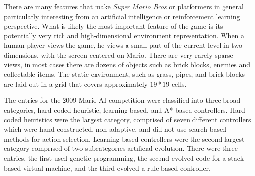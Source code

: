 \documentclass[12pt]{article}
\begin{document}
\begin{multicols*}{2}
There are many features that make \textit {Super Mario Bros} or platformers in general particularly interesting from 
an artificial intelligence or reinforcement learning perspective. What is likely the most important feature of the game 
is its potentially very rich and high-dimensional environment representation. When a human player views the 
game, he views a small part of the current level in two dimensions, with the screen centered on Mario. There are 
very rarely sparse views, in most cases there are dozens of objects such as brick blocks, enemies and collectable 
items. The static environment, such as grass, pipes, and brick blocks are laid out in a grid that covers 
approximately $19 * 19$ cells.

The entries for the 2009 Mario AI competition were classified into three broad categories, hard-coded heuristic, 
learning-based, and A*-based controllers. Hard-coded heuristics were the largest category, comprised of seven 
different controllers which were hand-constructed, non-adaptive, and did not use search-based methods for action selection. Learning based controllers were the second largest category comprised of two subcategories artificial evolution. There were three entries, the first used genetic programming, the second evolved code for a stack-based virtual machine, and the third evolved a rule-based controller. 
\end{multicols*}
\end{document}
